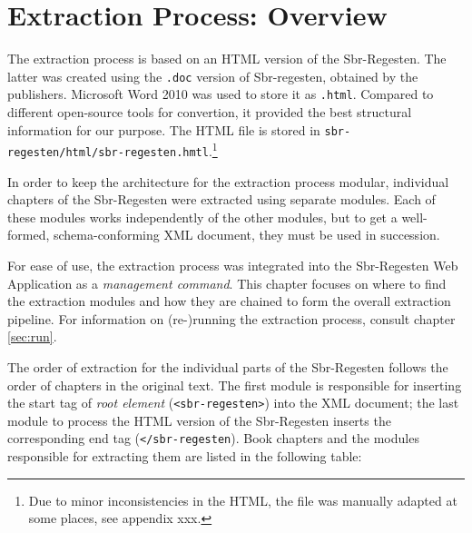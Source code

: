 \section{Extraction Process: Overview}
\label{sec:overview}

The extraction process is based on an HTML version of the Sbr-Regesten. The latter was created using the \texttt{.doc} version of Sbr-regesten, obtained by the publishers. Microsoft Word 2010 was used to store it as \texttt{.html}. Compared to different open-source tools for convertion, it provided the best structural information for our purpose. The HTML file is stored in \texttt{sbr-regesten/html/sbr-regesten.hmtl}.\footnote{Due to minor inconsistencies in the HTML, the file was manually adapted at some places, see appendix xxx.}

In order to keep the architecture for the extraction process modular,
individual chapters of the Sbr-Regesten were extracted using separate
modules. Each of these modules works independently of the other
modules, but to get a well-formed, schema-conforming XML document,
they must be used in succession.

For ease of use, the extraction process was integrated into the
Sbr-Regesten Web Application as a \emph{management command}. This
chapter focuses on where to find the extraction modules and how they
are chained to form the overall extraction pipeline. For information
on (re-)running the extraction process, consult chapter \ref{sec:run}.

The order of extraction for the individual parts of the Sbr-Regesten
follows the order of chapters in the original text. The first module
is responsible for inserting the start tag of \emph{root element}
(\texttt{<sbr-regesten>}) into the XML document; the last module to
process the HTML version of the Sbr-Regesten inserts the corresponding
end tag (\texttt{</sbr-regesten}). Book chapters and the modules
responsible for extracting them are listed in the following table:

